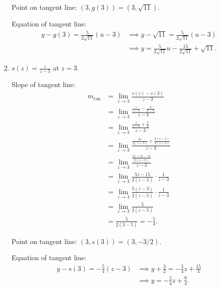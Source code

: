 \documentclass[nooutcomes, handout]{ximera}
\begin{document}
\begin{problem}
\begin{enumerate}
\begin{freeResponse}
        Point on tangent line: $(3, g(3)) = (3, \sqrt{11})$.

        Equation of tangent line:
        \begin{align*}
          y - g(3) = \frac{5}{2\sqrt{11}}(u-3)
          &\implies y - \sqrt{11} = \frac{5}{2\sqrt{11}}(u - 3)\\
          &\implies y = \frac{5}{2\sqrt{11}}u - \frac{15}{2\sqrt{11}} + \sqrt{11}.
        \end{align*}
      \end{freeResponse}

    \item
      $\displaystyle s(z) = \frac{z}{z-5}$ at $z = 3$.
      \begin{freeResponse}
        Slope of tangent line:
        \begin{align*}
          m_{\mathrm{tan}}
          &= \lim_{z \to 3} \frac{s(z) - s(3)}{z-3}  \\
		&= \lim_{z \to 3} \frac{\frac{z}{z-5} - \frac{3}{3-5}}{z-3}  \\
		&= \lim_{z \to 3} \frac{\frac{z}{z-5} + \frac{3}{2}}{z-3}  \\
		&= \lim_{z \to 3} \frac{\frac{2z}{2(z-5)} + \frac{3(z-5)}{2(z-5)}}{z-3}  \\
		&= \lim_{z \to 3} \frac{\frac{2z + 3z - 15}{2(z-5)}}{z-3}  \\
		&= \lim_{z \to 3} \frac{5z-15}{2(z-5)} \cdot \frac{1}{z-3}  \\
		&= \lim_{z \to 3} \frac{5(z-3)}{2(z-5)} \cdot \frac{1}{z-3}  \\
		&= \lim_{z \to 3} \frac{5}{2(z-5)}  \\
		&= \frac{5}{2(3-5)} = -\frac{5}{4}.
	\end{align*}

        Point on tangent line: $(3, s(3)) = (3, -3/2)$.

        Equation of tangent line:
        \begin{align*}
          y - s(3) = - \frac{5}{4}(z-3) &\implies y + \frac{3}{2} = - \frac{5}{4}z + \frac{15}{4}\\
          &\implies y = - \frac{5}{4} z + \frac{9}{4}.
        \end{align*}
      \end{freeResponse}
  \end{enumerate}
\end{problem}
\end{document}
